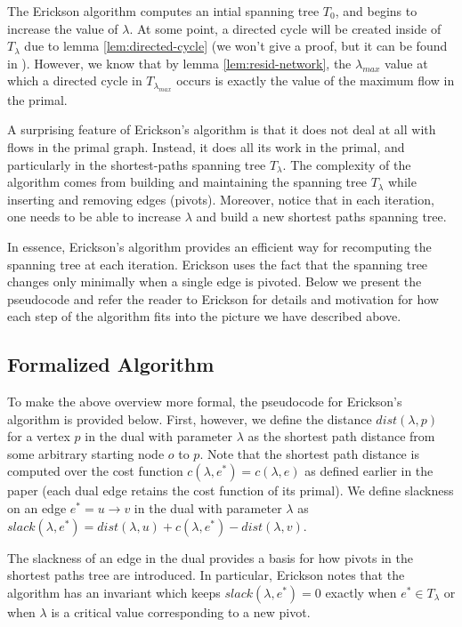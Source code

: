 \documentclass[12pt]{article}
\begin{document}
The Erickson algorithm computes an intial spanning tree $T_0$, and begins to increase the value of $\lambda$. At some point, a directed cycle will be created inside of $T_\lambda$ due to lemma \ref{lem:directed-cycle} (we won't give a proof, but it can be found in \cite{erickson2010}). However, we know that by lemma \ref{lem:resid-network}, the $\lambda_{max}$ value at which a directed cycle in $T_{\lambda_{max}}$ occurs is exactly the value of the maximum flow in the primal.

A surprising feature of Erickson's algorithm is that it does not deal at all with flows in the primal graph. Instead, it does all its work in the primal, and particularly in the shortest-paths spanning tree $T_{\lambda}$. The complexity of the algorithm comes from building and maintaining the spanning tree $T_{\lambda}$ while inserting and removing edges (pivots). Moreover, notice that in each iteration, one needs to be able to increase $\lambda$ and build a new shortest paths spanning tree. 

In essence, Erickson's algorithm provides an efficient way for recomputing the spanning tree at each iteration. Erickson uses the fact that the spanning tree changes only minimally when a single edge is pivoted. Below we present the pseudocode and refer the reader to Erickson \cite{erickson2010} for details and motivation for how each step of the algorithm fits into the picture we have described above.

\subsection{Formalized Algorithm}

To make the above overview more formal, the pseudocode for Erickson's algorithm is provided below. First, however, we define the distance $dist(\lambda, p)$ for a vertex $p$ in the dual with parameter $\lambda$ as the shortest path distance from some arbitrary starting node $o$ to $p$. Note that the shortest path distance is computed over the cost function $c(\lambda, e^*) = c(\lambda, e)$ as defined earlier in the paper (each dual edge retains the cost function of its primal). We define slackness on an edge $e^* = u \to v$ in the dual with parameter $\lambda$ as $slack(\lambda, e^*) = dist(\lambda, u) + c(\lambda, e^*) - dist(\lambda, v)$. 

The slackness of an edge in the dual provides a basis for how pivots in the shortest paths tree are introduced. In particular, Erickson notes that the algorithm has an invariant which keeps $slack(\lambda, e^*) = 0$ exactly when $e^* \in T_{\lambda}$ or when $\lambda$ is a critical value corresponding to a new pivot. 
\end{document}
